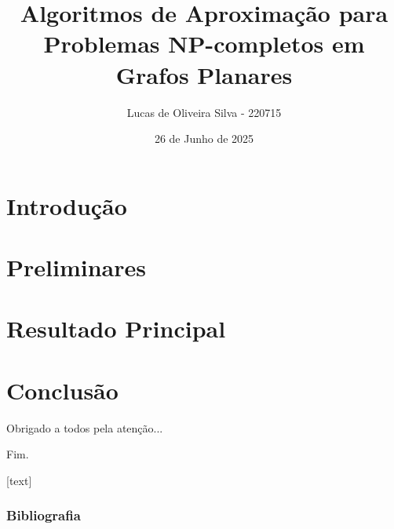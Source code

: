 \documentclass[xcolor=table]{beamer}
\title{Algoritmos de Aproximação para Problemas NP-completos em Grafos Planares}
\author{
Lucas de Oliveira Silva - 220715
}
\date{\vfill\hfill 26 de Junho de 2025}
\begin{document}

\begin{frame}[plain]
  \titlepage
\end{frame}


\section{Introdução}


\section{Preliminares}


\section{Resultado Principal}


\section{Conclusão}


\begin{frame}
  \large{\centerline{Obrigado a todos pela atenção...}}
  \Huge{\centerline{Fim.}}
\end{frame}


\appendix

\beamerdefaultoverlayspecification{}
[text]
\begin{frame}
  \frametitle{Bibliografia}
  {
    \tiny
    
    
  }
\end{frame}

\end{document}
